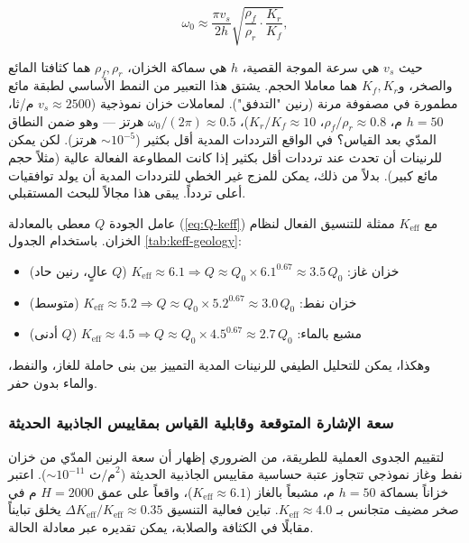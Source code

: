 \documentclass[12pt,a4paper]{article}
\newcommand{\Keff}{K_{\mathrm{eff}}}
\theoremstyle{remark}
\begin{document}
	\begin{equation}
		\omega_0 \approx \frac{\pi v_s}{2h} \sqrt{\frac{\rho_f}{\rho_r} \cdot \frac{K_r}{K_f}},
		\label{eq:resonant-frequency}
	\end{equation}
	
	حيث \(v_s\) هي سرعة الموجة القصية، \(h\) هي سماكة الخزان، \(\rho_f, \rho_r\) هما كثافتا المائع والصخر، و\(K_f, K_r\) هما معاملا الحجم. يشتق هذا التعبير من النمط الأساسي لطبقة مائع مطمورة في مصفوفة مرنة (رنين "التدفق"). لمعاملات خزان نموذجية (\(v_s \approx 2500\) م/ثا، \(h = 50\) م، \(\rho_f/\rho_r \approx 0.8\)، \(K_r/K_f \approx 10\))، \(\omega_0/(2\pi) \approx 0.5\) هرتز — وهو ضمن النطاق المدّي بعد القياس؟ في الواقع الترددات المدية أقل بكثير (\(\sim 10^{-5}\) هرتز). لكن يمكن للرنينات أن تحدث عند ترددات أقل بكثير إذا كانت المطاوعة الفعالة عالية (مثلاً حجم مائع كبير). بدلاً من ذلك، يمكن للمزج غير الخطي للترددات المدية أن يولد توافقيات أعلى تردداً. يبقى هذا مجالاً للبحث المستقبلي.
	
	عامل الجودة \(Q\) معطى بالمعادلة (\ref{eq:Q-keff}) مع \(\Keff\) ممثلة للتنسيق الفعال لنظام الخزان. باستخدام الجدول \ref{tab:keff-geology}:
	
	\begin{itemize}
		\item خزان غاز: \(\Keff \approx 6.1 \Rightarrow Q \approx Q_0 \times 6.1^{0.67} \approx 3.5\,Q_0\) (\(Q\) عالٍ، رنين حاد)
		\item خزان نفط: \(\Keff \approx 5.2 \Rightarrow Q \approx Q_0 \times 5.2^{0.67} \approx 3.0\,Q_0\) (متوسط)
		\item مشبع بالماء: \(\Keff \approx 4.5 \Rightarrow Q \approx Q_0 \times 4.5^{0.67} \approx 2.7\,Q_0\) (\(Q\) أدنى)
	\end{itemize}
	
	وهكذا، يمكن للتحليل الطيفي للرنينات المدية التمييز بين بنى حاملة للغاز، والنفط، والماء بدون حفر.
	
	\subsubsection{سعة الإشارة المتوقعة وقابلية القياس بمقاييس الجاذبية الحديثة}
	\label{subsubsec:signal_amplitude}
	
	لتقييم الجدوى العملية للطريقة، من الضروري إظهار أن سعة الرنين المدّي من خزان نفط وغاز نموذجي تتجاوز عتبة حساسية مقاييس الجاذبية الحديثة (\( \sim 10^{-11} \text{ م/ث}^2\)). اعتبر خزاناً بسماكة \(h = 50\) م، مشبعاً بالغاز (\(\Keff \approx 6.1\))، واقعاً على عمق \(H = 2000\) م في صخر مضيف متجانس بـ \(\Keff \approx 4.0\). تباين فعالية التنسيق \(\Delta \Keff / \Keff \approx 0.35\) يخلق تبايناً مقابلًا في الكثافة والصلابة، يمكن تقديره عبر معادلة الحالة.
	
\end{document}

